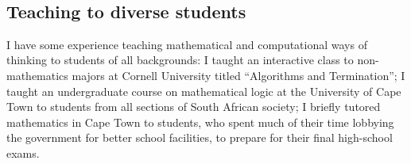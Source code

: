\documentclass[10,a4paper,sans]{moderncv}
\begin{document}
\

\subsection{Teaching to diverse students}
I have some experience teaching mathematical and computational ways of thinking to students of all backgrounds: I taught an interactive class to non-mathematics majors at Cornell University titled ``Algorithms and Termination''; I taught an undergraduate course on mathematical logic at the University of Cape Town to students from all sections of South African society; I briefly tutored mathematics in Cape Town to students, who spent much of their time lobbying the government for better school facilities, to prepare for their final high-school exams.
\end{document}
